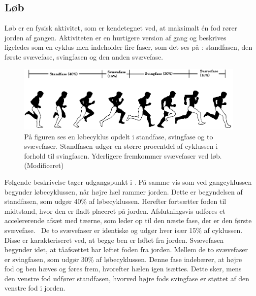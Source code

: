 \subsection{Løb}
Løb er en fysisk aktivitet, som er kendetegnet ved, at maksimalt én fod rører jorden af gangen. Aktiviteten er en hurtigere version af gang og beskrives ligeledes som en cyklus men indeholder fire faser, som det ses på : standfasen, den første svævefase, svingfasen og den anden svævefase. \citep{Adelaar1986,Novacheck1998}
\begin{figure}[H]
	\centering
	\includegraphics[scale=0.55]{figures/bProblemloesning/loeb_cyklus1.png}
	\caption{På figuren ses en løbecyklus opdelt i standfase, svingfase og to svævefaser. Standfasen udgør en større procentdel af cyklussen i forhold til svingfasen. Yderligere fremkommer svævefaser ved løb.~\citep{Adelaar1986} (Modificeret)}
	\label{fig:loebecyklus}
\end{figure}\vspace{-0.25cm}
Følgende beskrivelse tager udgangspunkt i . På samme vis som ved gangcyklussen begynder løbecyklussen, når højre hæl rammer jorden. Dette er begyndelsen af standfasen, som udgør 40\% af løbecyklussen. Herefter fortsætter foden til midtstand, hvor den er fladt placeret på jorden. Afslutningsvis udføres et accelererende afsæt med tæerne, som leder op til den næste fase, der er den første svævefase.~\citep{Adelaar1986,Novacheck1998} \newline 
De to svævefaser er identiske og udgør hver især 15\% af cyklussen. Disse er karakteriseret ved, at begge ben er løftet fra jorden. Svævefasen begynder idet, at tåafsættet har løftet foden fra jorden. Mellem de to svævefaser er svingfasen, som udgør 30\% af løbecyklussen. Denne fase indebærer, at højre fod og ben hæves og føres frem, hvorefter hælen igen isættes. Dette sker, mens den venstre fod udfører standfasen, hvorved højre fods svingfase er støttet af den venstre fod i jorden.~\citep{Adelaar1986,Novacheck1998} %

